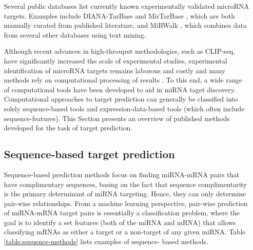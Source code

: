 Several public databases list currently known experimentally validated
microRNA targets. Examples include DIANA-TarBase \citep{Vlachos2015} and
MirTarBase \citep{Chou2016}, which are both manually curated from published
literature, and MiRWalk \citep{Dweep2015}, which combines data from several
other databases using text mining.

Although recent advances in high-throuput methodologies, such as CLIP-seq,
have significantly increased the scale of experimental studies, experimental
identification of microRNA targets remains laborous and costly and many
methods rely on computational processing of results \citep{Vlachos2015}. To
this end, a wide range of computational tools have been developed to aid in
miRNA taget discovery. Computational approaches to target prediction
can generally be classified into solely sequence-based tools and
expression-data-based tools (which often include sequence-features).
This Section presents an overview of published methods developed for the
task of target prediction.





\subsection{Sequence-based target prediction}

Sequence-based prediction methods focus on finding miRNA-mRNA pairs that
have complimentary sequences, basing on the fact that sequence complimentarity
is the primary determinant of miRNA targeting. Hence, they can
only determine pair-wise relationships. From a machine learning perspective,
pair-wise prediction of miRNA-mRNA target pairs is essentially a classification
problem, where the goal is to identify a set features (both of the miRNA and
mRNA) that allows classifying mRNAs as either a target or a non-target of any
given miRNA. Table \ref{table:sequence-methods} lists examples of sequence-
based methods.

